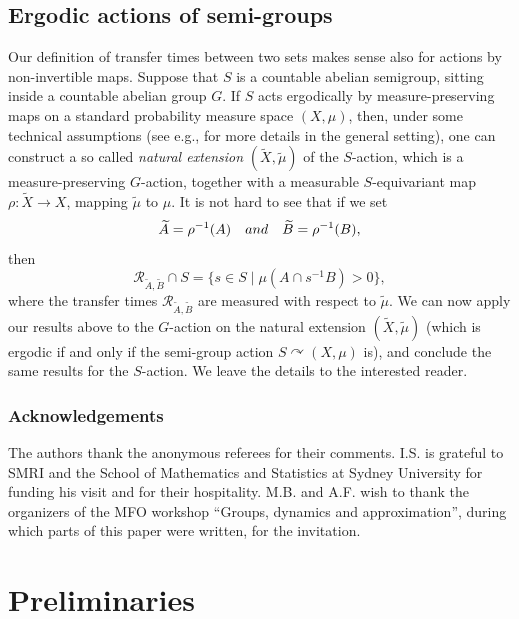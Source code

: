 \documentclass[11pt]{article}
\newcommand{\eg}{e.g.,\xspace}
\numberwithin{equation}{section}
\let\mathcal\mathscr
\newcommand{\cR}{\mathcal{R}}
\newcommand{\qand}{\quad\textup{and}\quad}
\let\acts\curvearrowright
\theoremstyle{plain}
\theoremstyle{definition}
\begin{document}
\subsection{Ergodic actions of semi-groups}

Our definition of transfer times between two sets makes sense also for actions by non-invertible maps. Suppose that $S$ is a countable
abelian semigroup, sitting inside a countable abelian group $G$. If $S$ acts ergodically by measure-preserving maps on a standard
probability measure space $(X,\mu)$, then, under some technical assumptions (see \eg \cite{La} for more details in the general setting), one can construct a
so called \emph{natural extension} $(\widetilde{X},\widetilde{\mu})$ of the $S$-action, which is a measure-preserving $G$-action, together with
a measurable $S$-equivariant map $\rho : \widetilde{X} \to X$, mapping $\widetilde{\mu}$ to $\mu$. It is not hard to see that if we
set
\[
\widetilde{A} = \rho^{-1}(A) \qand \widetilde{B} = \rho^{-1}(B),
\]
then
\[
\cR_{\widetilde{A},\widetilde{B}} \cap S = \bigl\{ s \in S \mid  \mu(A \cap s^{-1}B) > 0 \bigr\},
\]
where the transfer times $\cR_{\widetilde{A},\widetilde{B}}$ are measured with respect to $\tilde{\mu}$. We can now apply our results above
to the $G$-action on the natural extension $(\widetilde{X},\widetilde{\mu})$ (which is ergodic if and only if the semi-group action $S \acts (X,\mu)$ is), and conclude the same results for the
$S$-action. We leave the details to the interested reader.

\subsubsection*{Acknowledgements}
The authors thank the anonymous referees for their comments. I.S. is grateful to SMRI and the School of Mathematics and Statistics at Sydney University for funding his visit and for their hospitality.
M.B. and A.F. wish to thank the organizers of the MFO workshop ``Groups, dynamics and approximation'', during which parts of this paper
were written, for the invitation.

\section{Preliminaries}
\end{document}
